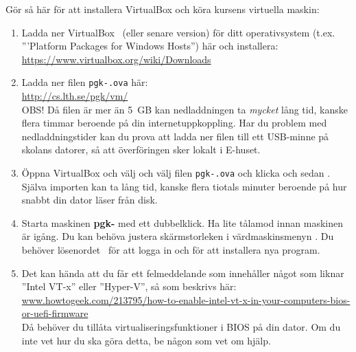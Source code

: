 Gör så här för att installera VirtualBox och köra kursens virtuella maskin:
\begin{enumerate}
\item  Ladda ner VirtualBox \VirtualBoxVersion~(eller senare version) för ditt operativsystem (t.ex. '''Platform Packages for Windows Hosts'') här och installera: \\ \url{https://www.virtualbox.org/wiki/Downloads}


\item     Ladda ner filen \texttt{pgk-\VMName.ova} här: \\ \url{http://cs.lth.se/pgk/vm/} \\ OBS! Då filen är mer än 5~GB kan nedladdningen ta \textit{mycket} lång tid, kanske flera timmar beroende på din internetuppkoppling. Har du problem med nedladdningstider kan du prova att ladda ner filen till ett USB-minne på skolans datorer, så att överföringen sker lokalt i E-huset.

\item     Öppna VirtualBox och välj  och välj filen \texttt{pgk-\VMName.ova} och klicka  och sedan . Själva importen kan ta lång tid, kanske flera tiotals minuter beroende på hur snabbt din dator läser från disk.

\item Starta maskinen \textbf{pgk-\VMName} med ett dubbelklick. Ha lite tålamod innan maskinen är igång. Du kan behöva justera skärmstorleken i värdmaskinsmenyn . Du  behöver lösenordet~\textbf{\texttt{\VMPassword}} för att logga in och för att installera nya program. 

\item Det kan hända att du får ett felmeddelande som innehåller något som liknar ''Intel VT-x'' eller ''Hyper-V'', så som beskrivs här:
\\ \href{http://www.howtogeek.com/213795/how-to-enable-intel-vt-x-in-your-computers-bios-or-uefi-firmware/}{www.howtogeek.com/213795/how-to-enable-intel-vt-x-in-your-computers-bios-or-uefi-firmware}\\
Då behöver du tillåta virtualiseringsfunktioner i BIOS på din dator. Om du inte vet hur du ska göra detta, be någon som vet om hjälp.


\end{enumerate}
